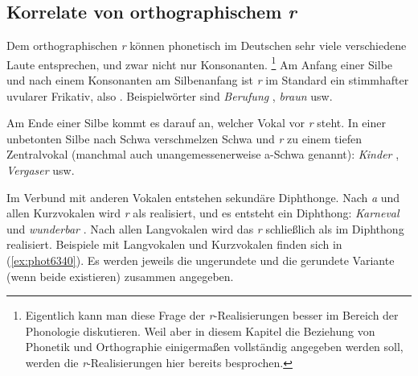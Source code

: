 \subsection{Korrelate von orthographischem \textit{r}}

\label{sec:realisr}

Dem orthographischen \textit{r} können phonetisch im Deutschen sehr viele verschiedene Laute entsprechen, und zwar nicht nur Konsonanten.%
\footnote{Eigentlich kann man diese Frage der \textit{r}-Realisierungen besser im Bereich der Phonologie diskutieren.
Weil aber in diesem Kapitel die Beziehung von Phonetik und Orthographie einigermaßen vollständig angegeben werden soll, werden die \textit{r}-Realisierungen hier bereits besprochen.}
Am Anfang einer Silbe und nach einem Konsonanten am Silbenanfang ist \textit{r} im Standard ein stimmhafter uvularer Frikativ, also \textipa{[K]}.
Beispielwörter sind \textit{Berufung} \textipa{[b@Ku:fUN]}, \textit{braun} \textipa{[bK\t{aO}n]} usw.

Am Ende einer Silbe kommt es darauf an, welcher Vokal vor \textit{r} steht.
In einer unbetonten Silbe nach Schwa verschmelzen Schwa und \textit{r} zu einem tiefen Zentralvokal \textipa{[5]} (manchmal auch unangemessenerweise a-Schwa genannt): \textit{Kinder} \textipa{[kInd5]}, \textit{Vergaser} \textipa{[f5ga:z5]} usw.


Im Verbund mit anderen Vokalen entstehen sekundäre Diphthonge.
Nach \textit{a} und allen Kurzvokalen wird \textit{r} als \textipa{[@]} realisiert, und es entsteht ein Diphthong: \textit{Karneval} \textipa{[k\t{a@}n@val]} und \textit{wunderbar} \textipa{[vUnd5b\t{a@}]}.
Nach allen Langvokalen wird das \textit{r} schließlich als \textipa{[5]} im Diphthong realisiert.
Beispiele mit Langvokalen und Kurzvokalen finden sich in (\ref{ex:phot6340}).
Es werden jeweils die ungerundete und die gerundete Variante (wenn beide existieren) zusammen angegeben.

\enlargethispage{1\baselineskip}
\begin{exe}
  \ex\label{ex:phot6340}
  \begin{xlist}
  \end{xlist}
\end{exe}

